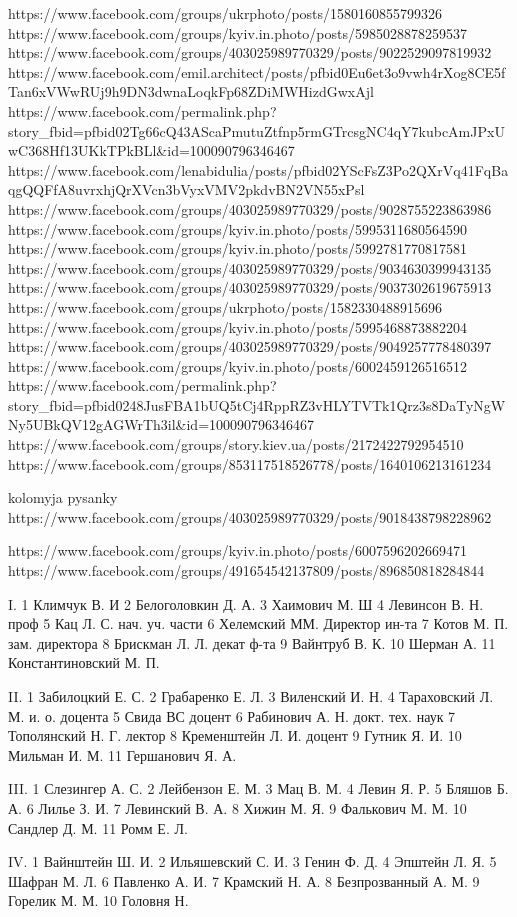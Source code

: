 https://www.facebook.com/groups/ukrphoto/posts/1580160855799326
https://www.facebook.com/groups/kyiv.in.photo/posts/5985028878259537
https://www.facebook.com/groups/403025989770329/posts/9022529097819932
https://www.facebook.com/emil.architect/posts/pfbid0Eu6et3o9vwh4rXog8CE5fTan6xVWwRUj9h9DN3dwnaLoqkFp68ZDiMWHizdGwxAjl
https://www.facebook.com/permalink.php?story_fbid=pfbid02Tg66cQ43AScaPmutuZtfnp5rmGTrcsgNC4qY7kubcAmJPxUwC368Hf13UKkTPkBLl&id=100090796346467
https://www.facebook.com/lenabidulia/posts/pfbid02YScFsZ3Po2QXrVq41FqBaqgQQFfA8uvrxhjQrXVcn3bVyxVMV2pkdvBN2VN55xPsl
https://www.facebook.com/groups/403025989770329/posts/9028755223863986
https://www.facebook.com/groups/kyiv.in.photo/posts/5995311680564590
https://www.facebook.com/groups/kyiv.in.photo/posts/5992781770817581
https://www.facebook.com/groups/403025989770329/posts/9034630399943135
https://www.facebook.com/groups/403025989770329/posts/9037302619675913
https://www.facebook.com/groups/ukrphoto/posts/1582330488915696
https://www.facebook.com/groups/kyiv.in.photo/posts/5995468873882204
https://www.facebook.com/groups/403025989770329/posts/9049257778480397
https://www.facebook.com/groups/kyiv.in.photo/posts/6002459126516512
https://www.facebook.com/permalink.php?story_fbid=pfbid0248JusFBA1bUQ5tCj4RppRZ3vHLYTVTk1Qrz3s8DaTyNgWNy5UBkQV12gAGWrTh3il&id=100090796346467
https://www.facebook.com/groups/story.kiev.ua/posts/2172422792954510
https://www.facebook.com/groups/853117518526778/posts/1640106213161234

kolomyja pysanky
https://www.facebook.com/groups/403025989770329/posts/9018438798228962

https://www.facebook.com/groups/kyiv.in.photo/posts/6007596202669471
https://www.facebook.com/groups/491654542137809/posts/896850818284844

I. 1 Климчук В. И
   2 Белоголовкин Д. А.
   3 Хаимович М. Ш
   4 Левинсон В. Н. проф
   5 Кац Л. С. нач. уч. части
   6 Хелемский ММ. Директор ин-та
   7 Котов М. П. зам. директора
   8 Брискман Л. Л. декат ф-та
   9 Вайнтруб В. К.
   10 Шерман А.
   11 Константиновский М. П.

II. 1 Забилоцкий Е. С.
    2 Грабаренко Е. Л.
    3 Виленский И. Н.
    4 Тараховский Л. М. и. о. доцента
    5 Свида ВС доцент
    6 Рабинович А. Н. докт. тех. наук
    7 Тополянский Н. Г. лектор
    8 Кременштейн Л. И. доцент
    9 Гутник Я. И.
    10 Мильман И. М.
    11 Гершанович Я. А.

III. 1 Слезингер А. С.
     2 Лейбензон Е. М.
     3 Мац В. М.
     4 Левин Я. Р.
     5 Бляшов Б. А.
     6 Лилье З. И.
     7 Левинский В. А.
     8 Хижин М. Я.
     9 Фалькович М. М.
     10 Сандлер Д. М.
     11 Ромм Е. Л.

IV. 1 Вайнштейн Ш. И.
    2 Ильяшевский С. И.
    3 Генин Ф. Д.
    4 Эпштейн Л. Я.
    5 Шафран М. Л.
    6 Павленко А. И.
    7 Крамский Н. А.
    8 Безпрозванный А. М.
    9 Горелик М. М.
    10 Головня Н.

